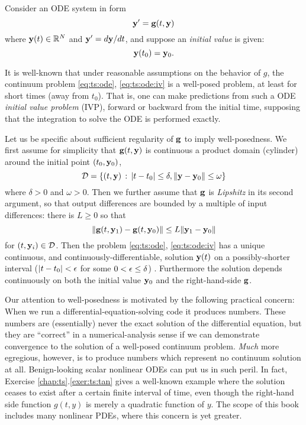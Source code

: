 Consider an ODE system in form
\begin{equation}
\mathbf{y}' = \mathbf{g}(t,\mathbf{y})  \label{eq:ts:ode}
\end{equation}
where $\mathbf{y}(t) \in \mathbb{R}^N$ and $\mathbf{y}'=d\mathbf{y}/dt$, and suppose an \emph{initial value} is given:
\begin{equation}
\mathbf{y}(t_0) = \mathbf{y}_0.  \label{eq:ts:ode:iv}
\end{equation}

It is well-known that under reasonable assumptions on the behavior of $g$, the continuum problem \eqref{eq:ts:ode}, \eqref{eq:ts:ode:iv} is a well-posed problem, at least for short times (away from $t_0$).  That is, one can make predictions from such a ODE \emph{initial value problem} (IVP), forward or backward from the initial time, supposing that the integration to solve the ODE is performed exactly.

Let us be specific about sufficient regularity of $\mathbf{g}$ to imply well-posedness.  We first assume for simplicity that $\mathbf{g}(t,\mathbf{y})$ is continuous a product domain (cylinder) around the initial point $(t_0,\mathbf{y}_0)$,
   $$\mathcal{D} = \{(t,\mathbf{y}) \,:\, |t-t_0| \le \delta, \|\mathbf{y} - \mathbf{y}_0\| \le \omega\}$$
where $\delta > 0$ and $\omega > 0$.  Then we further assume that $\mathbf{g}$ is \emph{Lipshitz} in its second argument, so that output differences are bounded by a multiple of input differences: there is $L\ge 0$ so that
   $$\|\mathbf{g}(t,\mathbf{y}_1) - \mathbf{g}(t,\mathbf{y}_0)\| \le L \|\mathbf{y}_1-\mathbf{y}_0\|$$
for $(t,\mathbf{y}_i) \in \mathcal{D}$.  Then the problem \eqref{eq:ts:ode}, \eqref{eq:ts:ode:iv} has a unique continuous, and continuously-differentiable, solution $\mathbf{y}(t)$ on a possibly-shorter interval ($|t-t_0|<\epsilon$ for some $0 < \epsilon \le \delta$) \citep[section 17.5]{HirschSmaleDevaney2004}.  Furthermore the solution depends continuously on both the initial value $\mathbf{y}_0$ and the right-hand-side $\mathbf{g}$.

Our attention to well-posedness is motivated by the following practical concern:  When we run a differential-equation-solving code it produces numbers.  These numbers are (essentially) never the exact solution of the differential equation, but they are ``correct'' in a numerical-analysis sense if we can demonstrate convergence to the solution of a well-posed continuum problem.  \emph{Much} more egregious, however, is to produce numbers which represent no continuum solution at all.  Benign-looking scalar nonlinear ODEs can put us in such peril.  In fact, Exercise \ref{chap:ts}.\ref{exer:ts:tan} gives a well-known example where the solution ceases to exist after a certain finite interval of time, even though the right-hand side function $g(t,y)$ is merely a quadratic function of $y$.  The scope of this book includes many nonlinear PDEs, where this concern is yet greater.

